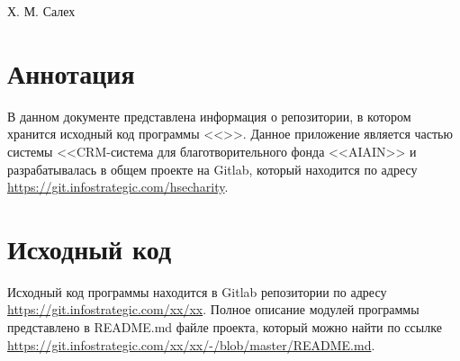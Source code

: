 \documentclass[a4paper,12pt]{article}
\begin{document}
	
	
	
	{Х. М. Салех}

	\firstPage
	\newpage
	\secondPage
	\newpage
	\newpage
	\thirdPageWithoutTOC
	\section*{Аннотация}
	
	В данном документе представлена информация о репозитории, в котором хранится исходный код программы <<>>. Данное приложение является частью системы <<CRM-система для благотворительного фонда <<AIAIN>> и разрабатывалась в общем проекте на Gitlab, который находится по адресу \url{https://git.infostrategic.com/hsecharity}.
	
	\newpage
	
	\section*{Исходный код}
	
	Исходный код программы находится в Gitlab репозитории по адресу \url{https://git.infostrategic.com/xx/xx}. Полное описание модулей программы представлено в README.md файле проекта, который можно найти по ссылке \url{https://git.infostrategic.com/xx/xx/-/blob/master/README.md}.

	\newpage
	\listRegistration
\end{document}
